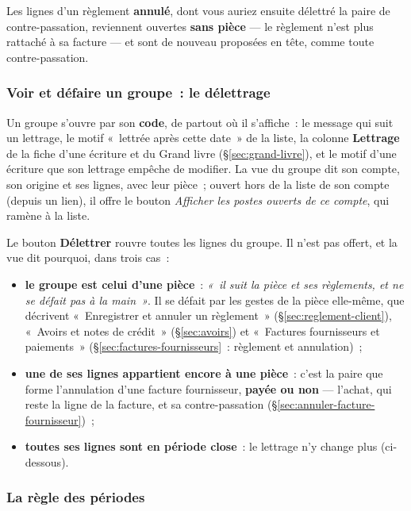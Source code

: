 \documentclass[a4paper,11pt,oneside]{article}
\begin{document}
Les lignes d'un règlement \textbf{annulé}, dont vous auriez ensuite délettré la paire de
contre-passation, reviennent ouvertes \textbf{sans pièce} --- le règlement n'est plus rattaché
à sa facture --- et sont de nouveau proposées en tête, comme toute contre-passation.

\subsubsection{Voir et défaire un groupe~: le délettrage}

Un groupe s'ouvre par son \textbf{code}, de partout où il s'affiche~: le message qui suit un
lettrage, le motif «~lettrée après cette date~» de la liste, la colonne \textbf{Lettrage} de la
fiche d'une écriture et du Grand livre (\S\ref{sec:grand-livre}), et le motif d'une écriture
que son lettrage empêche de modifier. La vue du groupe dit son compte, son origine et ses
lignes, avec leur pièce~; ouvert hors de la liste de son compte (depuis un lien), il offre le bouton \emph{Afficher les
postes ouverts de ce compte}, qui ramène à la liste.

Le bouton \textbf{Délettrer} rouvre toutes les lignes du groupe. Il n'est pas offert, et la vue
dit pourquoi, dans trois cas~:

\begin{itemize}
    \item \textbf{le groupe est celui d'une pièce}~: \emph{«~il suit la pièce et ses règlements,
          et ne se défait pas à la main~»}. Il se défait par les gestes de la pièce elle-même,
          que décrivent «~Enregistrer et annuler un règlement~» (\S\ref{sec:reglement-client}),
          «~Avoirs et notes de crédit~» (\S\ref{sec:avoirs}) et «~Factures fournisseurs et
          paiements~» (\S\ref{sec:factures-fournisseurs}~: règlement et annulation)~;
    \item \textbf{une de ses lignes appartient encore à une pièce}~: c'est la paire que forme
          l'annulation d'une facture fournisseur, \textbf{payée ou non} --- l'achat, qui reste la
          ligne de la facture, et sa contre-passation (\S\ref{sec:annuler-facture-fournisseur})~;
    \item \textbf{toutes ses lignes sont en période close}~: le lettrage n'y change plus
          (ci-dessous).
\end{itemize}

\subsubsection{La règle des périodes}
\end{document}
